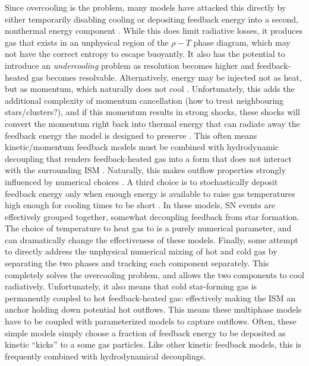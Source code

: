 Since overcooling is the problem, many models have attacked this directly by
either temporarily disabling cooling \citep{Thacker2000,Stinson2006} or
depositing feedback energy into a second, nonthermal energy component
\citep{Agertz2013}.  While this does limit radiative losses, it produces gas
that exists in an unphysical region of the $\rho-T$ phase diagram, which may not
have the correct entropy to escape buoyantly.  It also has the potential to
introduce an \textit{undercooling} problem as resolution becomes higher and
feedback-heated gas becomes resolvable.  Alternatively, energy may be injected
not as heat, but as momentum, which naturally does not cool
\citep{Scannapieco2006,DallaVecchia2008,Dubois2008}.  Unfortunately, this adds
the additional complexity of momentum cancellation (how to treat neighbouring
stars/clusters?), and if this momentum results in strong shocks, these shocks
will convert the momentum right back into thermal energy that can radiate away
the feedback energy the model is designed to preserve \citep{Durier2012}.  This
often means kinetic/momentum feedback models must be combined with hydrodynamic
decoupling that renders feedback-heated gas into a form that does not interact
with the surrounding ISM \citep{Springel2003,Vogelsberger2013}.  Naturally, this
makes outflow properties strongly influenced by numerical choices
\citet{DallaVecchia2008}.  A third choice is to stochastically deposit feedback
energy only when enough energy is available to raise gas temperatures high
enough for cooling times to be short \citep{DallaVecchia2012,Crain2015}.  In
these models, SN events are effectively grouped together, somewhat
decoupling feedback from star formation.  The choice of temperature to heat gas
to is a purely numerical parameter, and can dramatically change the
effectiveness of these models.  Finally, some \citep{Springel2003,Murante2015}
attempt to directly address the unphysical numerical mixing of hot and cold gas
by separating the two phases and tracking each component separately.  This
completely solves the overcooling problem, and allows the two components to cool
radiatively.   Unfortunately, it also means that cold star-forming gas is
permanently coupled to hot feedback-heated gas: effectively making the ISM an
anchor holding down potential hot outflows.  This means these multiphase models
have to be coupled with parameterized models to capture outflows.  Often, these
simple models simply choose a fraction of feedback energy to be deposited as
kinetic ``kicks'' to a some gas particles.  Like other kinetic feedback models,
this is frequently combined with hydrodynamical decouplings.

